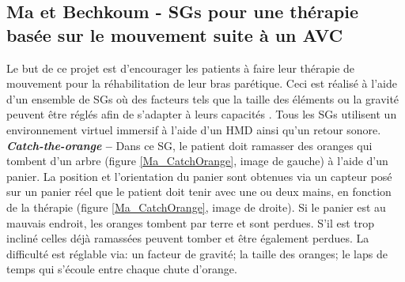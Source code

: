 


	\subsection*{Ma et Bechkoum - SGs pour une thérapie basée sur le mouvement suite à un AVC}
		Le but de ce projet est d'encourager les patients à faire leur thérapie de mouvement pour la réhabilitation de leur bras parétique. Ceci est réalisé à l'aide d'un ensemble de SGs où des facteurs tels que la taille des éléments ou la gravité peuvent être réglés afin de s'adapter à leurs capacités \cite{Ma_SG4MovTherapy}. Tous les SGs utilisent un environnement virtuel immersif à l'aide d'un HMD ainsi qu'un retour sonore.
		\\

		\textbf{\textit{Catch-the-orange} --} Dans ce SG, le patient doit ramasser des oranges qui tombent d'un arbre (figure \ref{Ma_CatchOrange}, image de gauche) à l'aide d'un panier. La position et l'orientation du panier sont obtenues via un capteur posé sur un panier réel que le patient doit tenir avec une ou deux mains, en fonction de la thérapie (figure \ref{Ma_CatchOrange}, image de droite). Si le panier est au mauvais endroit, les oranges tombent par terre et sont perdues. S'il est trop incliné celles déjà ramassées peuvent tomber et être également perdues.
		La difficulté est réglable via: un facteur de gravité; la taille des oranges; le laps de temps qui s'écoule entre chaque chute d'orange.
		
